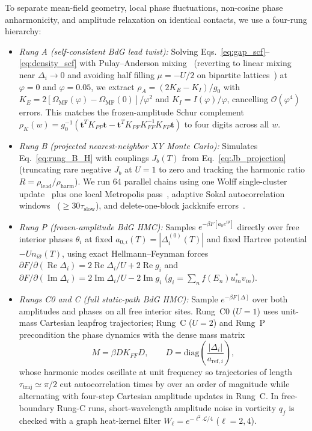 \documentclass[aps,prb,twocolumn,superscriptaddress,floatfix]{revtex4-2}
\newcommand{\rlead}{\rho_{\mathrm{lead}}}
\begin{document}
To separate mean-field geometry, local phase fluctuations, non-cosine phase anharmonicity, and amplitude relaxation on identical contacts, we use a four-rung hierarchy:
\begin{itemize}
\item \emph{Rung A (self-consistent BdG lead twist):} Solving Eqs.~\eqref{eq:gap_scf}--\eqref{eq:density_scf} with Pulay--Anderson mixing~\cite{And65,Pul80} (reverting to linear mixing near $\Delta_i \to 0$ and avoiding half filling $\mu = -U/2$ on bipartite lattices~\cite{Yan89}) at $\varphi = 0$ and $\varphi = 0.05$, we extract $\rho_A = (2K_E - K_I)/g_0$ with $K_E = 2[\Omega_{\mathrm{MF}}(\varphi) - \Omega_{\mathrm{MF}}(0)]/\varphi^2$ and $K_I = I(\varphi)/\varphi$, cancelling $\mathcal{O}(\varphi^4)$ errors. This matches the frozen-amplitude Schur complement $\rho_K(w) = g_0^{-1}(\bm{t}^T K_{PP}\bm{t} - \bm{t}^T K_{PF} K_{FF}^{-1} K_{FP}\bm{t})$ to four digits across all $w$.
\item \emph{Rung B (projected nearest-neighbor XY Monte Carlo):} Simulates Eq.~\eqref{eq:rung_B_H} with couplings $J_b(T)$ from Eq.~\eqref{eq:Jb_projection} (truncating rare negative $J_b$ at $U=1$ to zero and tracking the harmonic ratio $R = \rlead/\rho_{\mathrm{harm}}$). We run 64 parallel chains using one Wolff single-cluster update~\cite{Wol89} plus one local Metropolis pass~\cite{Metropolis1953}, adaptive Sokal autocorrelation windows~\cite{MS88} ($\ge 30\tau_{\mathrm{slow}}$), and delete-one-block jackknife errors~\cite{FP89,You15}.
\item \emph{Rung P (frozen-amplitude BdG HMC):} Samples $e^{-\beta F[a_0 e^{i\theta}]}$ directly over free interior phases $\theta_i$ at fixed $a_{0,i}(T) = |\Delta_i^{(0)}(T)|$ and fixed Hartree potential $-U n_{i\bar{\sigma}}(T)$, using exact Hellmann--Feynman forces $\partial F/\partial(\operatorname{Re}\Delta_i) = 2\operatorname{Re}\Delta_i/U + 2\operatorname{Re} g_i$ and $\partial F/\partial(\operatorname{Im}\Delta_i) = 2\operatorname{Im}\Delta_i/U - 2\operatorname{Im} g_i$ ($g_i = \sum_n f(E_n)u_{in}^*v_{in}$).
\item \emph{Rungs C0 and C (full static-path BdG HMC):} Sample $e^{-\beta F[\Delta]}$ over both amplitudes and phases on all free interior sites. Rung~C0 ($U=1$) uses unit-mass Cartesian leapfrog trajectories; Rung~C ($U=2$) and Rung~P precondition the phase dynamics with the dense mass matrix
\begin{equation}
M = \beta D K_{FF} D, \qquad D = \mathrm{diag}\!\left(\frac{|\Delta_i|}{a_{\mathrm{ref},i}}\right),
\label{eq:hmc_mass}
\end{equation}
whose harmonic modes oscillate at unit frequency so trajectories of length $\tau_{\mathrm{traj}} \simeq \pi/2$ cut autocorrelation times by over an order of magnitude while alternating with four-step Cartesian amplitude updates in Rung~C. In free-boundary Rung-C runs, short-wavelength amplitude noise in vorticity $q_f$ is checked with a graph heat-kernel filter $W_\ell = e^{-\ell^2\mathcal{L}/4}$ ($\ell = 2, 4$).
\end{itemize}
\end{document}
